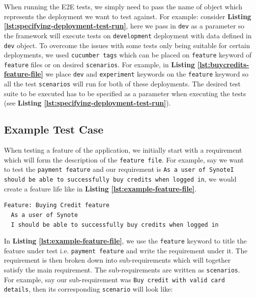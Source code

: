 When running the E2E tests, we simply need to pass the name of object which represents the deployment we want to test against. For example: consider \textbf{Listing \ref{lst:specifying-deployment-test-run}}, here we pass in \texttt{dev} as a parameter so the framework will execute tests on \texttt{development} deployment with data defined in \texttt{dev} object.  To overcome the issues with some tests only being suitable for certain deployments, we used \texttt{cucumber tags} which can be placed on \texttt{feature} keyword of \texttt{feature} files or on desired \texttt{scenarios}. For example, in \textbf{Listing \ref{lst:buycredits-feature-file}} we place \texttt{dev} and \texttt{experiment} keywords on the \texttt{feature} keyword so all the test \texttt{scenarios} will run for both of these deployments. The desired test suite to be executed has to be specified as a parameter when executing the tests (see \textbf{Listing \ref{lst:specifying-deployment-test-run}}).

 \subsection{Example Test Case}
\label{subsec:example-test-case}

When testing a feature of the application, we initially start with a requirement which will form the description of the \texttt{feature file}. For example, say we want to test the \texttt{payment feature} and our requirement is \texttt{As a user of SynoteI should be able to successfully buy credits when logged in}, we would create a feature life like in \textbf{Listing \ref{lst:example-feature-file}}.

\begin{listing}[H]
\begin{verbatim}
Feature: Buying Credit feature
  As a user of Synote
  I should be able to successfully buy credits when logged in
\end{verbatim}
\label{lst:example-feature-file}
\end{listing}

In \textbf{Listing \ref{lst:example-feature-file}}, we use the \texttt{feature} keyword to title the feature under test i.e. \texttt{payment feature} and write the requirement under it. The requirement is then broken down into sub-requirements which will together satisfy the main requirement. The sub-requirements are written as \texttt{scenarios}. For example, say our sub-requirement was \texttt{Buy credit with valid card details}, then its corresponding \texttt{scenario} will look like:

